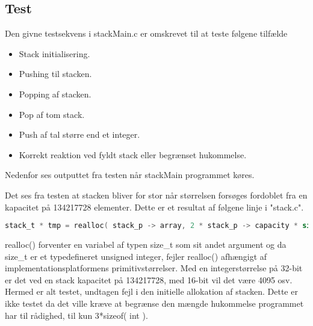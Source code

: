 \subsection{Test}
Den givne testsekvens i stackMain.c er omskrevet til at teste følgene tilfælde
\begin{itemize}
\item Stack initialisering.
\item Pushing til stacken.
\item Popping af stacken.
\item Pop af tom stack.
\item Push af tal større end et integer.
\item Korrekt reaktion ved fyldt stack eller begrænset hukommelse.
\end{itemize}

Nedenfor ses outputtet fra testen når stackMain programmet køres.


Det ses fra testen at stacken bliver for stor når størrelsen forsøges fordoblet fra en kapacitet på 134217728 elementer. Dette er et resultat af følgene linje i "stack.c".

\begin{lstlisting}[caption=stack.c udsnit, language=C]
stack_t * tmp = realloc( stack_p -> array, 2 * stack_p -> capacity * sizeof ( int ) );
\end{lstlisting}

realloc() forventer en variabel af typen size\_t som sit andet argument og da
size\_t er et typedefineret unsigned integer, fejler realloc() afhængigt af implementationsplatformens primitivstørrelser. Med en integerstørrelse på 32-bit er det ved en stack kapacitet på 134217728, med 16-bit vil det være 4095 osv. \\

Hermed er alt testet, undtagen fejl i den initielle allokation af stacken. Dette er ikke testet da det ville kræve at begrænse den mængde hukommelse programmet har til rådighed, til kun 3*sizeof( int ). 